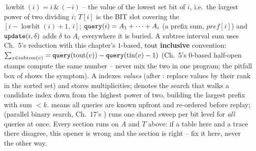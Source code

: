 \(\operatorname{lowbit}(i)=i\,\&\,(-i)\) -- the value of the lowest set bit of
\(i\), i.e.\ the largest power of two dividing \(i\); \(T[i]\) is the BIT slot
covering the  \([i{-}\operatorname{lowbit}(i){+}1,\,i]\);
\(\texttt{query}(i)=A_1+\cdots+A_i\) (a prefix sum, \(\mathit{pref}[i]\)) and
\(\texttt{update}(i,\delta)\) adds \(\delta\) to \(A_i\) everywhere it is
buried.  A subtree interval sum uses Ch.~5's reduction with this chapter's
\(1\)-based, \(\operatorname{tout}\) \textbf{inclusive} convention:
\(\sum_{x\in\operatorname{subtree}(v)}=\texttt{query}(\operatorname{tout}(v))-\texttt{query}(\operatorname{tin}(v)-1)\)
(Ch.~5's \(0\)-based half-open stamps compute the same number -- never mix
the two in one program; the pitfall box of  shows the
symptom).  A  indexes \emph{values} (after
: replace values by their rank in the sorted
set) and stores multiplicities;  denotes the search that walks
a candidate index down from the highest power of two, building the largest
prefix with sum \(<k\).   means all queries are known upfront
and re-ordered before replay;  (parallel binary search, Ch.~17's
) runs one shared sweep per bit level for \emph{all}
queries at once.  Every section runs on \(A\) and \(T\) above: if a table
here and a trace there disagree, this opener is wrong and the section is
right -- fix it here, never the other way.
